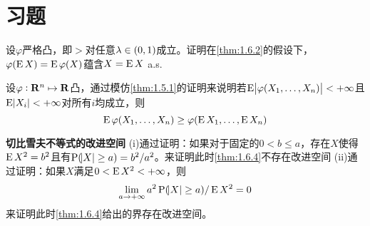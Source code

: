 \documentclass[../main.tex]{subfiles}
\begin{document}
\section*{习题}
\begin{exercise}
\item 设\(\varphi\)严格凸，即\(>\)对任意\(\lambda\in\intoo{0,1}\)成立。证明在\ref{thm:1.6.2}的假设下，\(\varphi(\operatorname{E} X)=\operatorname{E}\varphi(X)\)蕴含\(X=\operatorname{E} X\) a.s.
\item 设\(\varphi:\mathbf{R}^n\mapsto\mathbf{R}\)凸，通过模仿\ref{thm:1.5.1}的证明来说明若\(\E\envert{\varphi(X_1,\dots,X_n)}<+\infty\)且\(\E\envert{X_i}<+\infty\)对所有\(i\)均成立，则
\[\operatorname{E}\varphi(X_1,\dots,X_n)\geq\varphi(\operatorname{E} X_1,\dots,\operatorname{E} X_n)\]
\item \textbf{切比雪夫不等式的改进空间}
(i)通过证明：如果对于固定的\(0<b\leq a\)，存在\(X\)使得\(\operatorname{E} X^2=b^2\)且有\(\probP(\envert{X}\geq a)=b^2/a^2\)。来证明此时\autoref{thm:1.6.4}不存在改进空间
(ii)通过证明：如果\(X\)满足\(0<\operatorname{E} X^2<+\infty\)，则
\[\lim\limits_{a\rightarrow+\infty}a^2\probP(\envert{X}\geq a)/\E X^2=0\]
来证明此时\ref{thm:1.6.4}给出的界存在改进空间。


\end{exercise}
\end{document}

